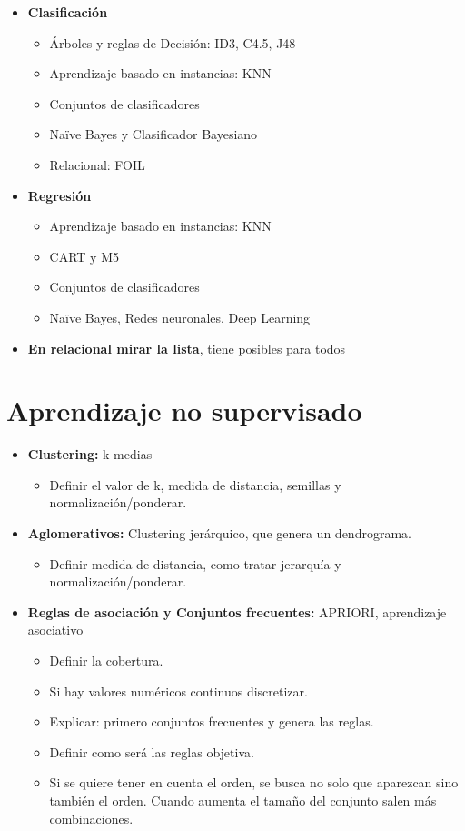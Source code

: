 \documentclass[12pt, twoside, openright]{report} %
\begin{document}
\begin{itemize}
  \item \textbf{Clasificación}
  \begin{itemize}
    \item Árboles y reglas de Decisión: ID3, C4.5, J48
    \item Aprendizaje basado en instancias: KNN
    \item Conjuntos de clasificadores
    \item Naïve Bayes y Clasificador Bayesiano
    \item Relacional: FOIL
  \end{itemize}
  \item \textbf{Regresión}
  \begin{itemize}
    \item Aprendizaje basado en instancias: KNN
    \item CART y M5
    \item Conjuntos de clasificadores
    \item Naïve Bayes, Redes neuronales, Deep Learning
  \end{itemize}
  \item \textbf{En relacional mirar la lista}, tiene posibles para todos
\end{itemize}

\section{Aprendizaje no supervisado}
\begin{itemize}
  \item \textbf{Clustering:} k-medias
  \begin{itemize}
    \item Definir el valor de k, medida de distancia, semillas y normalización/ponderar.
  \end{itemize}
  \item \textbf{Aglomerativos:} Clustering jerárquico, que genera un dendrograma.
  \begin{itemize}
    \item Definir medida de distancia, como tratar jerarquía y normalización/ponderar.
  \end{itemize}
  \item \textbf{Reglas de asociación y Conjuntos frecuentes:} APRIORI, aprendizaje asociativo
  \begin{itemize}
    \item Definir la cobertura.
    \item Si hay valores numéricos continuos discretizar.
    \item Explicar: primero conjuntos frecuentes y genera las reglas.
    \item Definir como será las reglas objetiva.
    \item Si se quiere tener en cuenta el orden, se busca no solo que aparezcan sino también el orden. Cuando aumenta el tamaño del conjunto salen más combinaciones.
  \end{itemize}
\end{itemize}
\end{document}
